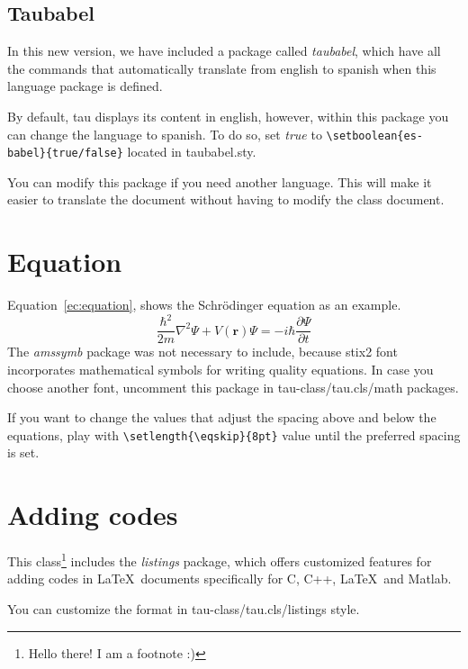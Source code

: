 \documentclass[9pt,a4paper,twoside]{tau-class/tau}
\begin{document}
    \subsection{Taubabel}

        In this new version, we have included a package called \textit{taubabel}, which have all the commands that automatically translate from english to spanish when this language package is defined.
		
        By default, tau displays its content in english, however, within this package you can change the language to spanish. To do so, set \textit{true} to \verb|\setboolean{es-babel}{true/false}| located in taubabel.sty.
		
        You can modify this package if you need another language. This will make it easier to translate the document without having to modify the class document.
		
\section{Equation}

    Equation~\ref{ec:equation}, shows the Schrödinger equation as an example. 
	\begin{equation} \label{ec:equation}
		\frac{\hbar^2}{2m}\nabla^2\Psi + V(\mathbf{r})\Psi = -i\hbar \frac{\partial\Psi}{\partial t}
	\end{equation} 
    The \textit{amssymb} package was not necessary to include, because stix2 font incorporates mathematical symbols for writing quality equations. In case you choose another font, uncomment this package in tau-class/tau.cls/math packages.
	
    If you want to change the values that adjust the spacing above and below the equations, play with \verb|\setlength{\eqskip}{8pt}| value until the preferred spacing is set.
	
\section{Adding codes}
	
    This class\footnote{Hello there! I am a footnote :)} includes the \textit{listings} package, which offers customized features for adding codes in \LaTeX\ documents specifically for C, C++, \LaTeX\ and Matlab. 
	
    You can customize the format in tau-class/tau.cls/listings style.
	
	\nolinenumbers
	
	\linenumbers
	
\end{document}
